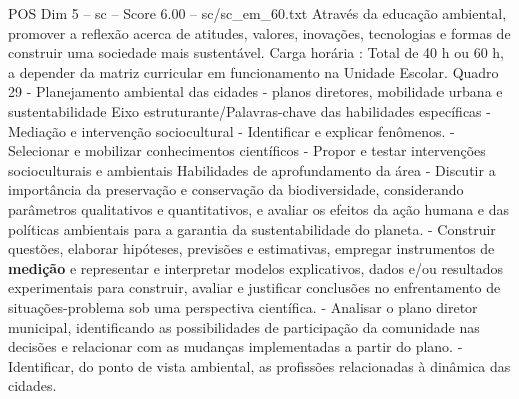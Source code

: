 \begin{textsample}{POS Dim 5 – sc – Score 6.00 – sc/sc\_em\_60.txt}
Através da educação ambiental, promover a reflexão acerca de atitudes, valores, inovações, tecnologias e formas de construir uma sociedade mais sustentável.
Carga horária : Total de 40 h ou 60 h, a depender da matriz curricular em funcionamento na Unidade Escolar.
Quadro 29 - Planejamento ambiental das cidades - planos diretores, mobilidade urbana e sustentabilidade Eixo estruturante/Palavras-chave das habilidades específicas - Mediação e intervenção sociocultural - Identificar e explicar fenômenos. - Selecionar e mobilizar conhecimentos científicos - Propor e testar intervenções socioculturais e ambientais Habilidades de aprofundamento da área - Discutir a importância da preservação e conservação da biodiversidade, considerando parâmetros qualitativos e quantitativos, e avaliar os efeitos da ação humana e das políticas ambientais para a garantia da sustentabilidade do planeta. - Construir questões, elaborar hipóteses, previsões e estimativas, empregar instrumentos de \textbf{medição} e representar e interpretar modelos explicativos, dados e/ou resultados experimentais para construir, avaliar e justificar conclusões no enfrentamento de situações-problema sob uma perspectiva científica. - Analisar o plano diretor municipal, identificando as possibilidades de participação da comunidade nas decisões e relacionar com as mudanças implementadas a partir do plano. - Identificar, do ponto de vista ambiental, as profissões relacionadas à dinâmica das cidades.

\end{textsample}

